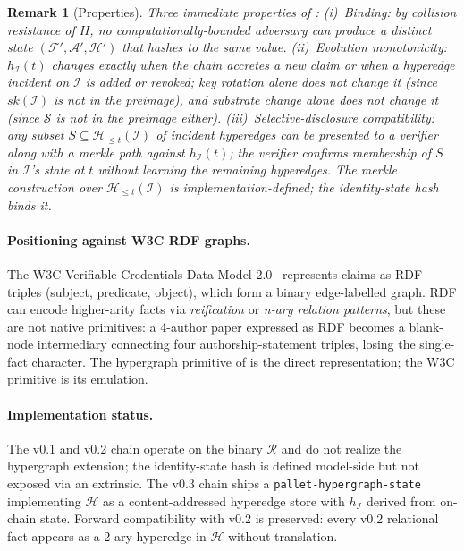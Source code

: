 \documentclass[11pt,a4paper,parskip=half-,DIV=12,headings=standardclasses]{scrartcl}
\theoremstyle{ncthm}
\theoremstyle{ncdef}
\newtheorem{remark}[theorem]{Remark}
\newcommand{\identity}{\mathcal{I}}
\newcommand{\substrate}{\mathcal{S}}
\newcommand{\founding}{\mathcal{F}}
\newcommand{\accretion}{\mathcal{A}}
\newcommand{\relations}{\mathcal{R}}
\begin{document}
\begin{remark}[Properties]\label{rem:state-hash-properties}
Three immediate properties of :
(i)~\emph{Binding}: by collision resistance of $H$, no
computationally-bounded adversary can produce a distinct state
$(\founding', \accretion', \mathcal{H}')$ that hashes to the same
value. (ii)~\emph{Evolution monotonicity}: $h_{\identity}(t)$ changes
exactly when the chain accretes a new claim or when a hyperedge
incident on $\identity$ is added or revoked; key rotation alone does
not change it (since $sk(\identity)$ is not in the preimage), and
substrate change alone does not change it (since $\substrate$ is not
in the preimage either). (iii)~\emph{Selective-disclosure
compatibility}: any subset $S \subseteq \mathcal{H}_{\le t}(\identity)$
of incident hyperedges can be presented to a verifier along with a
merkle path against $h_{\identity}(t)$; the verifier confirms
membership of $S$ in $\identity$'s state at $t$ without learning the
remaining hyperedges. The merkle construction over
$\mathcal{H}_{\le t}(\identity)$ is implementation-defined; the
identity-state hash binds it.
\end{remark}

\paragraph{Positioning against W3C RDF graphs.} The W3C Verifiable
Credentials Data Model 2.0~\cite{w3c-vcdm-2} represents claims as RDF
triples (subject, predicate, object), which form a binary
edge-labelled graph. RDF can encode higher-arity facts via
\emph{reification} or \emph{n-ary relation patterns}, but these are
not native primitives: a 4-author paper expressed as RDF becomes a
blank-node intermediary connecting four authorship-statement triples,
losing the single-fact character. The hypergraph primitive of
 is the direct representation; the W3C primitive
is its emulation.

\paragraph{Implementation status.} The v0.1 and v0.2 chain operate on
the binary $\relations$ and do not realize the hypergraph extension;
the identity-state hash is defined model-side but not exposed via an
extrinsic. The v0.3 chain ships a \texttt{pallet-hypergraph-state}
implementing $\mathcal{H}$ as a content-addressed hyperedge store
with $h_{\identity}$ derived from on-chain state. Forward
compatibility with v0.2 is preserved: every v0.2 relational fact
appears as a 2-ary hyperedge in $\mathcal{H}$ without translation.
\end{document}
